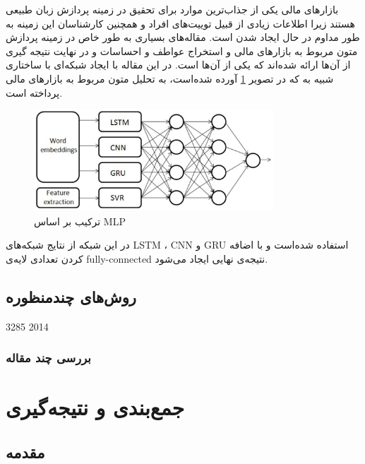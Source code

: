 \documentclass[12pt, a4paper, oneside]{report}
\begin{document}
بازارهای مالی یکی از جذاب‌ترین موارد برای تحقیق در زمینه پردازش زبان طبیعی هستند زیرا اطلاعات زیادی از قبیل
توییت‌های افراد و همچنین کارشناسان این زمینه به طور مداوم در حال ایجاد شدن است. مقاله‌های بسیاری به طور خاص در زمینه
پردازش متون مربوط به بازارهای مالی و استخراج عواطف و احساسات و در نهایت نتیجه گیری از آن‌ها ارائه شده‌اند که
\cite{akhtar2017multilayer}
یکی از آن‌ها است. در این مقاله با ایجاد شبکه‌ای با ساختاری شبیه به
که در تصویر
\ref{fig:MLP-ensemble}
آورده شده‌است، به تحلیل متون مربوط به بازار‌های مالی پرداخته است.

\begin{figure}[h]
    \centering
    \includegraphics[width=0.8\textwidth]{MLPENSEMBLE}
    \caption{ ترکیب بر اساس MLP }
    \label{fig:MLP-ensemble}
\end{figure}

در این شبکه از نتایج شبکه‌های
LSTM
،
CNN
و 
GRU
استفاده شده‌است و با اضافه کردن تعدادی لایه‌ی
fully-connected
نتیجه‌ی نهایی ایجاد می‌شود.

\section{ روش‌های چندمنظوره }

\cite{kalchbrenner-etal-2014-convolutional} 3285 2014

\subsection{بررسی چند مقاله}


\chapter{جمع‌بندی و نتیجه‌گیری}
\pagebreak
\section{مقدمه}

\begin{latin}
    
\end{latin}
\end{document}
